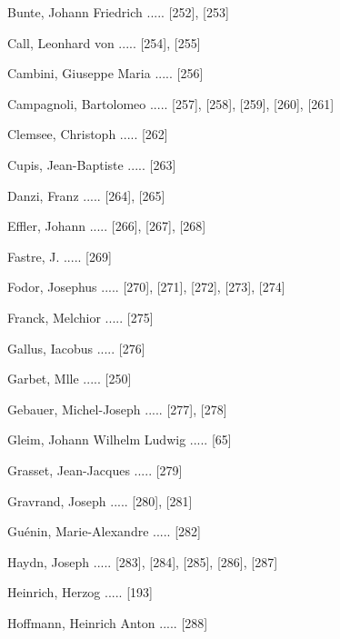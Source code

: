 \documentclass[twocolumn]{book}
\begin{document}
\newline 
Bunte, Johann Friedrich ..... [252], [253]

\newline 
Call, Leonhard von ..... [254], [255]

\newline 
Cambini, Giuseppe Maria ..... [256]

\newline 
Campagnoli, Bartolomeo ..... [257], [258], [259], [260], [261]

\newline 
Clemsee, Christoph ..... [262]

\newline 
Cupis, Jean-Baptiste ..... [263]

\newline 
Danzi, Franz ..... [264], [265]

\newline 
Effler, Johann ..... [266], [267], [268]

\newline 
Fastre, J. ..... [269]

\newline 
Fodor, Josephus ..... [270], [271], [272], [273], [274]

\newline 
Franck, Melchior ..... [275]

\newline 
Gallus, Iacobus ..... [276]

\newline 
Garbet, Mlle ..... [250]

\newline 
Gebauer, Michel-Joseph ..... [277], [278]

\newline 
Gleim, Johann Wilhelm Ludwig ..... [65]

\newline 
Grasset, Jean-Jacques ..... [279]

\newline 
Gravrand, Joseph ..... [280], [281]

\newline 
Guénin, Marie-Alexandre ..... [282]

\newline 
Haydn, Joseph ..... [283], [284], [285], [286], [287]

\newline 
Heinrich, Herzog ..... [193]

\newline 
Hoffmann, Heinrich Anton ..... [288]
\end{document}
